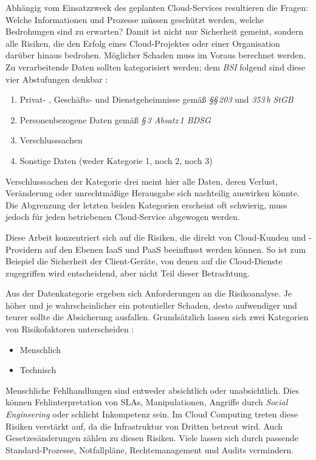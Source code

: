 \noindent
Abhängig vom Einsatzzweck des geplanten Cloud-Services resultieren die Fragen: Welche Informationen und Prozesse müssen geschützt werden, welche Bedrohungen sind zu erwarten? Damit ist nicht nur Sicherheit gemeint, sondern alle Risiken, die den Erfolg eines Cloud-Projektes oder einer Organisation darüber hinaus bedrohen. Möglicher Schaden muss im Voraus berechnet werden. Zu verarbeitende Daten sollten kategorisiert werden; dem \emph{BSI} folgend sind diese vier Abstufungen denkbar \cite{bsi:2014:Anforderungskatalog}:

\begin{enumerate}
	\item Privat- , Geschäfts- und Dienstgeheimnisse gemäß \emph{§§\,203} und \emph{353\,b StGB}
	\item Personenbezogene Daten gemäß \emph{§\,3 Absatz\,1 BDSG}
	\item Verschlusssachen
	\item Sonstige Daten (weder Kategorie 1, noch 2, noch 3)	
\end{enumerate}

\noindent
Verschlusssachen der Kategorie drei meint hier alle Daten, deren Verlust, Veränderung oder unrechtmäßige Herausgabe sich nachteilig auswirken könnte. Die Abgrenzung der letzten beiden Kategorien erscheint oft schwierig, muss jedoch für jeden betriebenen Cloud-Service abgewogen werden.

Diese Arbeit konzentriert sich auf die Risiken, die direkt von Cloud-Kunden und -Providern auf den Ebenen IaaS und PaaS beeinflusst werden können. So ist zum Beispiel die Sicherheit der Client-Geräte, von denen auf die Cloud-Dienste zugegriffen wird entscheidend, aber nicht Teil dieser Betrachtung.

Aus der Datenkategorie ergeben sich Anforderungen an die Risikoanalyse. Je höher und je wahrscheinlicher ein potentieller Schaden, desto aufwendiger und teurer sollte die Absicherung ausfallen. Grundsätzlich lassen sich zwei Kategorien von Risikofaktoren unterscheiden \cite{monjur:2017:security-taxonomy}:
\begin{itemize}
	\item Menschlich
	\item Technisch
\end{itemize}

\noindent Menschliche Fehlhandlungen sind entweder absichtlich oder unabsichtlich. Dies können Fehlinterpretation von SLAs, Manipulationen, Angriffe durch \emph{Social Engineering} oder schlicht Inkompetenz sein. Im Cloud Computing treten diese Risiken verstärkt auf, da die Infrastruktur von Dritten betreut wird. Auch Gesetzesänderungen zählen zu diesen Risiken. Viele lassen sich durch passende Standard-Prozesse, Notfallpläne, Rechtemanagement und Audits vermindern.

